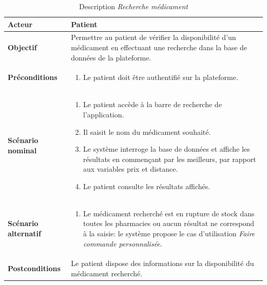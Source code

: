 \documentclass[12pt,a4paper]{report}
\begin{document}
\begin{table}[H]
    \centering
    \begin{tabular}{|p{4cm}|p{9cm}|}
        \hline
        \textbf{Acteur} & Patient \\
        \hline
        \textbf{Objectif} & Permettre au patient de vérifier la disponibilité d'un médicament en effectuant une recherche dans la base de données de la plateforme. \\
        \hline
        \textbf{Préconditions} &
        \begin{enumerate}
            \item Le patient doit être authentifié sur la plateforme.
        \end{enumerate} \\
        \hline
        \textbf{Scénario nominal} &
        \begin{enumerate}
            \item Le patient accède à la barre de recherche de l'application.
            \item Il saisit le nom du médicament souhaité.
            \item Le système interroge la base de données et affiche les résultats en commençant par les meilleurs, par rapport aux variables prix et distance.
            \item Le patient consulte les résultats affichés.
        \end{enumerate} \\
        \hline
        \textbf{Scénario alternatif} &
        \begin{enumerate}
            \item[2.a] Le médicament recherché est en rupture de stock dans toutes les pharmacies ou aucun résultat ne correspond à la saisie: le système propose le cas d'utilisation \textit{Faire commande personnalisée}.
        \end{enumerate} \\
        \hline
        \textbf{Postconditions} & Le patient dispose des informations sur la disponibilité du médicament recherché. \\
        \hline
    \end{tabular}
    \caption{Description \textit{Recherche médicament}}
\end{table}

\end{document}
